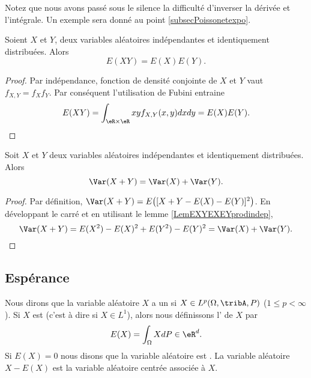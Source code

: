Notez que nous avons passé sous le silence la difficulté d'inverser la dérivée et l'intégrale. Un exemple sera donné au point \ref{subsecPoissonetexpo}.


\begin{lemma}       \label{LemEXYEXEYprodindep}
    Soient \( X\) et \( Y\), deux variables aléatoires indépendantes et identiquement distribuées. Alors
    \begin{equation}
        E(XY)=E(X)E(Y).
    \end{equation}
\end{lemma}

\begin{proof}
    Par indépendance, fonction de densité conjointe de \( X\) et \( Y\) vaut \( f_{X,Y}=f_Xf_Y\). Par conséquent l'utilisation de Fubini entraine
    \begin{equation}
        E(XY)=\int_{\eR\times\eR}xyf_{X,Y}(x,y)dxdy=E(X)E(Y).
    \end{equation}
\end{proof}

\begin{lemma}   \label{LemVarXpYsmindep}
    Soit \( X\) et \( Y\) deux variables aléatoires indépendantes et identiquement distribuées. Alors
    \begin{equation}
        \Var(X+Y)=\Var(X)+\Var(Y).
    \end{equation}
\end{lemma}

\begin{proof}
    Par définition, \( \Var(X+Y)=E\big( [X+Y-E(X)-E(Y)]^2 \big)\). En développant le carré et en utilisant le lemme \ref{LemEXYEXEYprodindep},
    \begin{equation}
        \Var(X+Y)=E(X^2)-E(X)^2+E(Y^2)-E(Y)^2=\Var(X)+\Var(Y).
    \end{equation}
\end{proof}

\subsection{Espérance}

Nous dirons que la variable aléatoire \( X\) a un  si \( X\in L^p(\Omega,\tribA,P)\) (\( 1\leq p<\infty\)). Si \( X\) est  (c'est à dire si \( X\in L^1\)), alors nous définissons l' de \( X\) par
\begin{equation}        \label{EqdCBLst}
    E(X)=\int_{\Omega}XdP\in\eR^d.
\end{equation}
Si \( E(X)=0\) nous disons que la variable aléatoire est . La variable aléatoire \( X-E(X)\) est la variable aléatoire centrée associée à \( X\).

